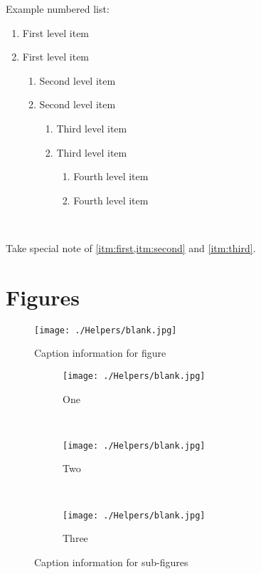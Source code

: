 Example numbered list:
\begin{enumerate}
    \item \label{itm:first} First level item
    \item \label{itm:second} First level item
    \begin{enumerate}
        \item \label{itm:third} Second level item
        \item Second level item
        \begin{enumerate}
        \item Third level item
        \item Third level item
        \begin{enumerate}
            \item Fourth level item
            \item Fourth level item
        \end{enumerate}
        \end{enumerate}
    \end{enumerate}
\end{enumerate} ~

Take special note of \cref{itm:first,itm:second} and \cref{itm:third}.


\section{Figures} \label{examples:figures}

\begin{figure}[H]
    \centering
    \texttt{[image: ./Helpers/blank.jpg]}
    \caption{Caption information for figure} 
    \label{fig:referenceToFigure1}
\end{figure}

\begin{figure}[H]
    \centering

    \begin{subfigure}[b]{0.3\textwidth}
        \texttt{[image: ./Helpers/blank.jpg]}
         \caption{One} 
         \label{fig:referenceToFigure1a}
    \end{subfigure}
    ~
    \begin{subfigure}[b]{0.3\textwidth}
        \texttt{[image: ./Helpers/blank.jpg]}
        \caption{Two}
    \end{subfigure}
    ~
    \begin{subfigure}[b]{0.3\textwidth}
        \texttt{[image: ./Helpers/blank.jpg]}
         \caption{Three}
    \end{subfigure}
    \caption{Caption information for sub-figures} 
    \label{fig:referenceToFigure2}
\end{figure}



